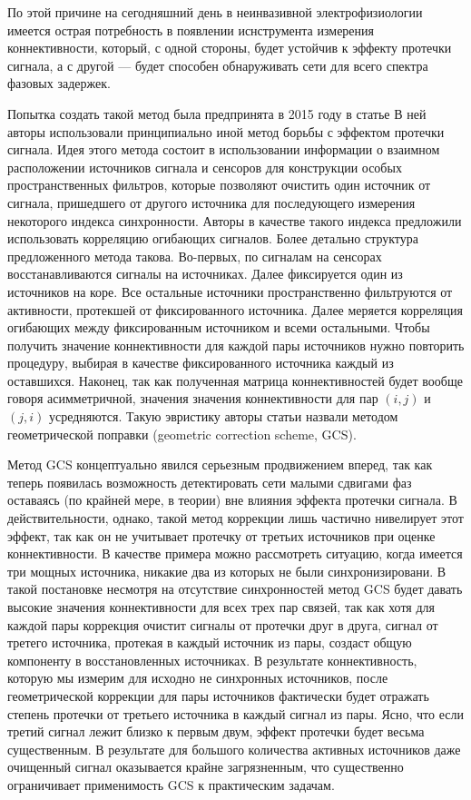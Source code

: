 По этой причине на сегодняшний день в неинвазивной электрофизиологии имеется острая
потребность в появлении иснструмента измерения коннективности, который, с одной стороны,
будет устойчив к эффекту протечки сигнала, а с другой --- будет способен обнаруживать сети
для всего спектра фазовых задержек.


Попытка создать такой метод была предпринята в 2015 году в статье
В ней авторы использовали принципиально иной метод борьбы с эффектом протечки сигнала.
Идея этого метода состоит в использовании информации
о взаимном расположении источников сигнала и сенсоров для конструкции особых пространственных
фильтров, которые позволяют очистить один источник
от сигнала, пришедшего от другого источника для последующего измерения
некоторого индекса синхронности. Авторы в качестве такого индекса предложили использовать корреляцию огибающих сигналов. Более детально структура
предложенного метода такова. Во-первых, по сигналам на сенсорах восстанавливаются сигналы на источниках.
Далее фиксируется один из источников на коре.
Все остальные источники пространственно фильтруются от активности, протекшей от фиксированного источника.
Далее меряется корреляция огибающих между фиксированным источником и всеми остальными.
Чтобы получить значение коннективности для каждой пары источников нужно повторить процедуру, выбирая
в качестве фиксированного источника каждый из оставшихся.
Наконец, так как полученная матрица коннективностей будет вообще говоря асимметричной, значения
значения коннективности для пар $(i,j)$ и $(j,i)$ усредняются. Такую эвристику авторы статьи назвали
методом геометрической поправки (geometric correction scheme, GCS).

Метод GCS концептуально явился серьезным продвижением вперед, так как теперь
появилась возможность детектировать сети малыми сдвигами фаз
оставаясь (по крайней мере, в теории) вне влияния эффекта протечки сигнала.
В действительности, однако, такой метод коррекции лишь частично нивелирует этот эффект,
так как он не учитывает протечку от третьих источников при оценке коннективности. В качестве примера
можно рассмотреть ситуацию, когда имеется три мощных источника,
никакие два из которых не были синхронизировани.
В такой постановке несмотря на отсутствие синхронностей метод GCS будет давать высокие значения коннективности
для всех трех пар связей, так как хотя для каждой пары коррекция очистит сигналы от протечки друг в друга,
сигнал от третего источника, протекая в каждый источник из пары, создаст общую компоненту в восстановленных источниках.
В результате коннективность, которую мы измерим для исходно не синхронных
источников, после геометрической коррекции для пары источников фактически будет отражать степень протечки
от третьего источника в каждый сигнал из пары. Ясно, что если третий сигнал лежит близко к первым двум,
эффект протечки будет весьма существенным. В результате для большого количества активных источников
даже очищенный сигнал оказывается крайне загрязненным, что существенно ограничивает применимость GCS к
практическим задачам.



